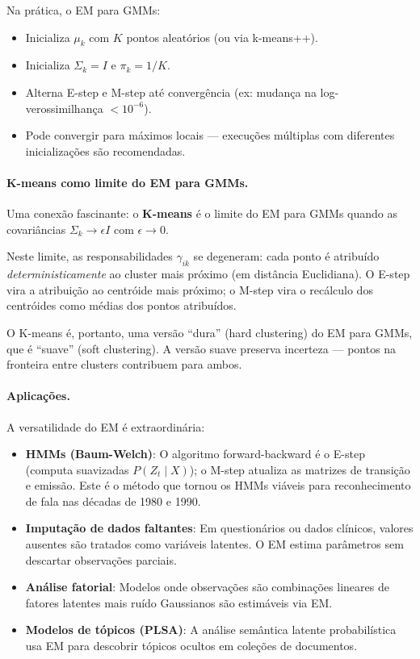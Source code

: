\documentclass{tufte-handout}
\begin{document}
\begin{exmp}
    Na prática, o EM para GMMs:
    \begin{itemize}
        \item Inicializa $\mu_k$ com $K$ pontos aleatórios (ou via k-means++).
        \item Inicializa $\Sigma_k = I$ e $\pi_k = 1/K$.
        \item Alterna E-step e M-step até convergência (ex: mudança na log-verossimilhança $< 10^{-6}$).
        \item Pode convergir para máximos locais --- execuções múltiplas com diferentes inicializações são recomendadas.
    \end{itemize}
\end{exmp}

\paragraph{K-means como limite do EM para GMMs.}

Uma conexão fascinante: o \textbf{K-means} é o limite do EM para GMMs quando as covariâncias $\Sigma_k \to \epsilon I$ com $\epsilon \to 0$.

Neste limite, as responsabilidades $\gamma_{ik}$ se degeneram: cada ponto é atribuído \textit{deterministicamente} ao cluster mais próximo (em distância Euclidiana). O E-step vira a atribuição ao centróide mais próximo; o M-step vira o recálculo dos centróides como médias dos pontos atribuídos.

O K-means é, portanto, uma versão ``dura'' (hard clustering) do EM para GMMs, que é ``suave'' (soft clustering). A versão suave preserva incerteza --- pontos na fronteira entre clusters contribuem para ambos.

\paragraph{Aplicações.}

A versatilidade do EM é extraordinária:

\begin{itemize}
    \item \textbf{HMMs (Baum-Welch)}: O algoritmo forward-backward é o E-step (computa suavizadas $P(Z_t \mid X)$); o M-step atualiza as matrizes de transição e emissão. Este é o método que tornou os HMMs viáveis para reconhecimento de fala nas décadas de 1980 e 1990.
    \item \textbf{Imputação de dados faltantes}: Em questionários ou dados clínicos, valores ausentes são tratados como variáveis latentes. O EM estima parâmetros sem descartar observações parciais.
    \item \textbf{Análise fatorial}: Modelos onde observações são combinações lineares de fatores latentes mais ruído Gaussianos são estimáveis via EM.
    \item \textbf{Modelos de tópicos (PLSA)}: A análise semântica latente probabilística usa EM para descobrir tópicos ocultos em coleções de documentos.
\end{itemize}
\end{document}
